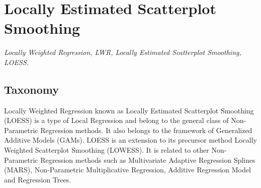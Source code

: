
\section{Locally Estimated Scatterplot Smoothing} 
\label{sec:loess}

\emph{Locally Weighted Regression, LWR, Locally Estimated Scatterplot Smoothing, LOESS.}

\subsection{Taxonomy}
Locally Weighted Regression known as Locally Estimated Scatterplot Smoothing (LOESS) is a type of Local Regression and belong to the general class of Non-Parametric Regression methods. It also belongs to the framework of Generalized Additive Models (GAMs).
LOESS is an extension to its precursor method Locally Weighted Scatterplot Smoothing (LOWESS).
It is related to other Non-Parametric Regression methods such as Multivariate Adaptive Regression Splines (MARS), Non-Parametric Multiplicative Regression, Additive Regression Model and Regression Trees. 

